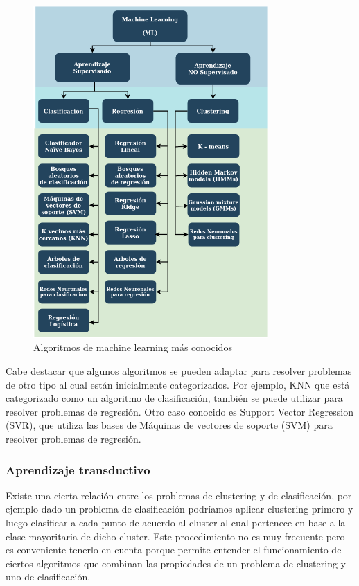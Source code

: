 \documentclass[12pt,a4paper]{article}
\begin{document}
\begin{sloppypar}
\begin{figure}[H]    %
  \centering
  \includegraphics[width=0.8\textwidth]{images/Diagrama_algoritmos.png}
  \caption{Algoritmos de machine learning más conocidos}  
  \label{fig:Diagrama_algoritmos}
\end{figure}

Cabe destacar que algunos algoritmos se pueden adaptar para resolver problemas de otro tipo al cual están inicialmente categorizados. Por ejemplo, KNN que está categorizado como un algoritmo de clasificación, también se puede utilizar para resolver problemas de regresión. Otro caso conocido es Support Vector Regression (SVR), que utiliza las bases de Máquinas de vectores de soporte (SVM) para resolver problemas de regresión.

\cleardoublepage

\subsubsection{Aprendizaje transductivo}

Existe una cierta relación entre los problemas de clustering y de clasificación, por ejemplo dado un problema de clasificación podríamos aplicar clustering primero y luego clasificar a cada punto de acuerdo al cluster al cual pertenece en base a la clase mayoritaria de dicho cluster. Este procedimiento no es muy frecuente pero es conveniente tenerlo en cuenta porque permite entender el funcionamiento de ciertos algoritmos que combinan las propiedades de un problema de clustering y uno de clasificación.


\end{sloppypar}
\end{document}
